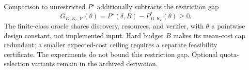 Comparison to unrestricted $P^\star$ additionally subtracts the restriction gap
$$G_{D,K_c,\mathcal V}(\theta)=P^\star(\delta,B)-P^*_{D,K_c}(\theta)\geq0.$$
The finite-class oracle shares discovery, resources, and verifier, with $\theta$ a pointwise design constant, not implemented input. Hard budget $B$ makes its mean-cost cap redundant; a smaller expected-cost ceiling requires a separate feasibility certificate. The experiments do not bound this restriction gap. Optional quota-selection variants remain in the archived derivation.
